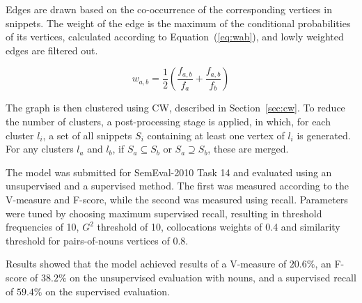 Edges are drawn based on the co-occurrence of the corresponding vertices in
snippets. The weight of the edge is the maximum of the conditional probabilities
of its vertices, calculated according to Equation~(\ref{eq:wab}), and lowly 
weighted edges are filtered out.

\begin{equation} \label{eq:wab}
 w_{a,b} = \frac{1}{2} \left( \frac{f_{a,b}}{f_a} + \frac{f_{a,b}}{f_b} \right)
\end{equation}

The graph is then clustered using \ac{CW}, described in Section~\ref{sec:cw}.
To reduce the number of clusters, a post-processing stage is applied, in which,
for each cluster $l_i$, a set of all snippets $S_i$ containing at least one
vertex of $l_i$ is generated. For any clusters $l_a$ and $l_b$, if
$S_a \subseteq S_b$  or $S_a \supseteq S_b$, these are merged.

The model was submitted for SemEval-2010 Task 14 \citep{manandhar2009semeval}
and evaluated using an unsupervised and a supervised method. The first was 
measured according to the V-measure and F-score, while the second was measured 
using recall. Parameters were tuned by choosing maximum supervised recall, 
resulting in threshold frequencies of 10, $G^2$ threshold of 10, collocations 
weights of 0.4 and similarity threshold for pairs-of-nouns vertices of 0.8.

Results showed that the model achieved results of a V-measure of $20.6\%$, an
F-score of $38.2\%$ on the unsupervised evaluation with nouns, and a supervised 
recall of $59.4\%$ on the supervised evaluation.

